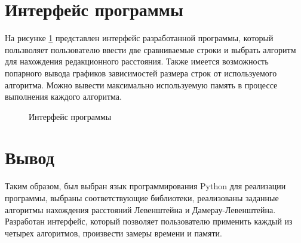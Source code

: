 \section {Интерфейс программы}
На рисунке \ref{interface} представлен интерфейс разработанной программы, который пользволяет пользователю ввести две сравниваемые строки и выбрать алгоритм для нахождения редакционного расстояния. Также имеется возможность попарного вывода графиков зависимостей размера строк от используемого алгоритма. Можно вывести максимально используемую память в процессе выполнения каждого алгоритма.
\begin{figure}[h]
	\caption{Интерфейс программы}
	\label{interface}
\end{figure}

\section{Вывод}
Таким образом, был выбран язык программирования Python для реализации программы, выбраны соответствующие библиотеки, реализованы заданные алгоритмы нахождения расстояний Левенштейна и Дамерау-Левенштейна. Разработан интерфейс, который позволяет пользователю применить каждый из четырех алгоритмов, произвести замеры времени и памяти. 